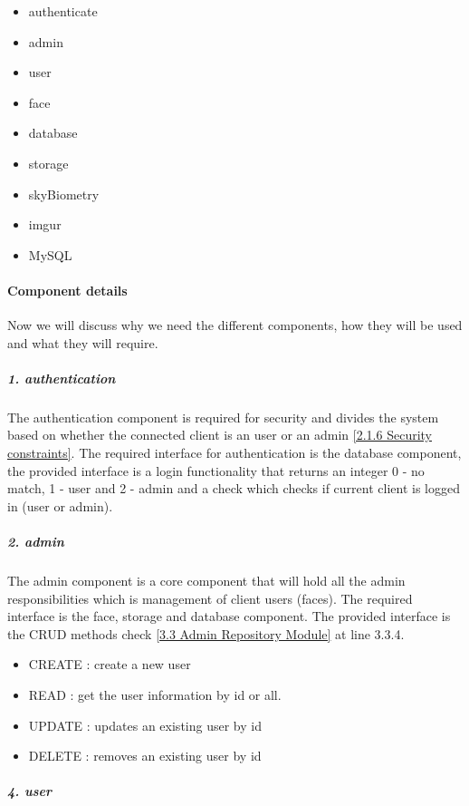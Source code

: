 \documentclass[a4paper,11pt]{article}
\begin{document}
\begin{itemize}
\item
  authenticate
\item
  admin
\item
  user
\item
  face
\item
  database
\item
  storage
\item
  skyBiometry
\item
  imgur
\item
  MySQL
\end{itemize}

\paragraph{Component details}\label{component-details}

Now we will discuss why we need the different components, how they will
be used and what they will require.

\subparagraph{1. authentication}\label{authentication}

The authentication component is required for security and divides the
system based on whether the connected client is an user or an admin \ref{2.1.6 Security constraints}. The
required interface for authentication is the database component, the
provided interface is a login functionality that returns an integer 0 -
no match, 1 - user and 2 - admin and a check which checks if current
client is logged in (user or admin).

\subparagraph{2. admin}\label{admin}

The admin component is a core component that will hold all the admin
responsibilities which is management of client users (faces). The
required interface is the face, storage and database component. The
provided interface is the CRUD methods check \ref{3.3 Admin Repository Module} at line 3.3.4.

\begin{itemize}
\item
  CREATE : create a new user
\item
  READ : get the user information by id or all.
\item
  UPDATE : updates an existing user by id
\item
  DELETE : removes an existing user by id
\end{itemize}

\subparagraph{4. user}\label{user}
\end{document}
